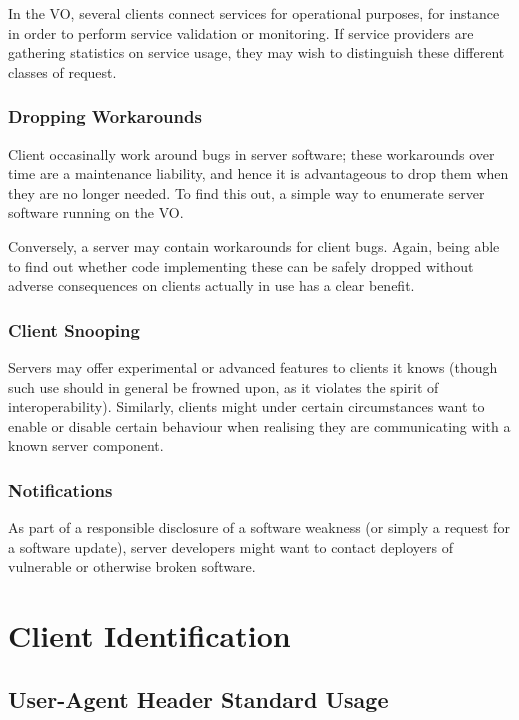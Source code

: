 \documentclass[11pt,a4paper]{ivoa}
\begin{document}
In the VO, several clients connect services for operational purposes,
for instance in order to perform service validation or monitoring. If
service providers are gathering statistics on service usage, they may
wish to distinguish these different classes of request.

\subsubsection{Dropping Workarounds}

Client occasinally work around bugs in server software; these
workarounds over time are a maintenance liability, and hence it is
advantageous to drop them when they are no longer needed.  To find this
out, a simple way to enumerate server software running on the VO.

Conversely, a server may contain workarounds for client bugs.  Again,
being able to find out whether code implementing these can be safely
dropped without adverse consequences on clients actually in use has a
clear benefit.

\subsubsection{Client Snooping}

Servers may offer experimental or advanced features to clients it knows
(though such use should in general be frowned upon, as it violates the
spirit of interoperability).  Similarly, clients might under certain
circumstances want to enable or disable certain behaviour when realising
they are communicating with a known server component.

\subsubsection{Notifications}

As part of a responsible disclosure of a software weakness (or simply a
request for a software update), server developers might want to contact
deployers of vulnerable or otherwise broken software.


\section{Client Identification}

\subsection{User-Agent Header Standard Usage}
\end{document}
